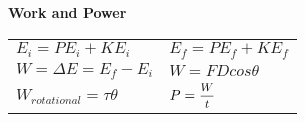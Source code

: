 \documentclass[12pt]{article}
\begin{document}
\begin{minipage}[t]{.5\textwidth}
\textbf{Work and Power} \\[6pt]
\begin{tabular}{p{4cm} p{6cm}}
	$E_i = PE_i + KE_i$ & $E_f = PE_f + KE_f$ \\[6pt]
	$W = \Delta E = E_f - E_i$ & $W = FDcos\theta$ \\[6pt]
	$W_{rotational} = \tau \theta$ & $P = \mfrac{W}{t}$ \\[6pt]
\end{tabular}	
\end{minipage}
\end{document}
